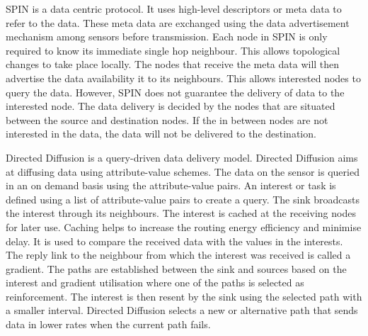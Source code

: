 SPIN is a data centric protocol. It uses high-level descriptors or meta data to refer to the data. These meta data are exchanged using the data advertisement mechanism among sensors before transmission. Each node in SPIN is only required to know its immediate single hop neighbour. This allows topological changes to take place locally. The nodes that receive the meta data will then advertise the data availability it to its neighbours. This allows interested nodes to query the data.
However, SPIN does not guarantee the delivery of data to the interested node. The data delivery is decided by the nodes that are situated between the source and destination nodes. If the in between nodes are not interested in the data, the data will not be delivered to the destination.






Directed Diffusion is a query-driven data delivery model. Directed Diffusion aims at diffusing data using attribute-value schemes. The data on the sensor is queried in an on demand basis using the attribute-value pairs. An interest or task is defined using a list of attribute-value pairs to create a query. The sink broadcasts the interest through its neighbours. The interest is cached at the receiving nodes for later use. Caching helps to increase the routing energy efficiency and minimise delay. It is used to compare the received data with the values in the interests. The reply link to the neighbour from which the interest was received is called a gradient. The paths are established between the sink and sources based on the interest and gradient utilisation where one of the paths is selected as reinforcement. The interest is then resent by the sink using the selected path with a smaller interval. Directed Diffusion selects a new or alternative path that sends data in lower rates when the current path fails.

